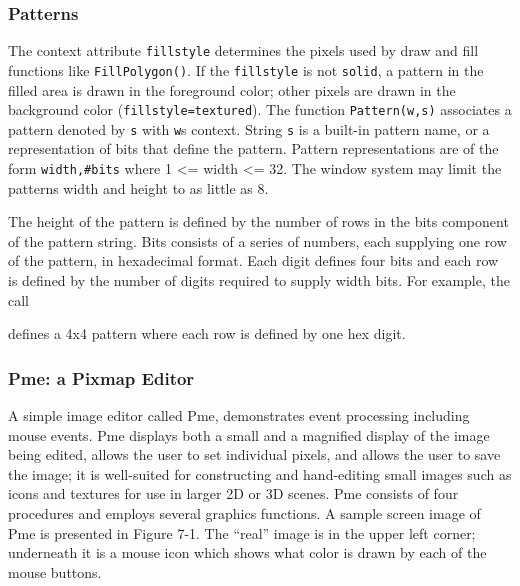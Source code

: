 \subsubsection{Patterns}

The context attribute \texttt{fillstyle} determines the
pixels used by draw and fill functions like \texttt{FillPolygon()}.
If the \texttt{fillstyle} is not \texttt{solid}, a pattern in
the filled area is drawn in the foreground color; other pixels are
drawn in the background color
(\texttt{{\textquotedbl}fillstyle=textured{\textquotedbl}}).
The function \texttt{Pattern(w,s)} associates a pattern
denoted by \texttt{s} with \texttt{w}{\textquotesingle}s context. String
\texttt{s} is a built-in pattern name, or a representation of bits that
define the pattern. Pattern representations are of the form
\texttt{{\textquotedbl}width,\#bits{\textquotedbl}} where
1 {\textless}= width
{\textless}= 32. The window system may limit 
the pattern{\textquotesingle}s width and height to as little as 8.

The height of the pattern is defined by the number of rows in the bits
component of the pattern string. Bits consists of a series of
numbers, each supplying one row of the pattern, in hexadecimal format.
Each digit defines four bits and each row is defined by the number of
digits required to supply width bits. For example, the call


\noindent defines a 4x4 pattern where each row is defined by one hex digit.

\subsubsection{Pme: a Pixmap Editor}

A simple image editor called Pme, demonstrates event processing
including mouse events. Pme displays both a small and a
{\textquotedbl}magnified{\textquotedbl} display of the image being
edited, allows the user to set individual pixels, and allows the user
to save the image; it is well-suited for constructing and hand-editing
small images such as icons and textures for use in larger 2D or 3D
scenes. Pme consists of four procedures and employs several graphics
functions. A sample screen image of Pme is presented in Figure 7-1. The
{\textquotedblleft}real{\textquotedblright} image is in the upper left
corner; underneath it is a mouse icon which shows what color is drawn
by each of the mouse buttons.




